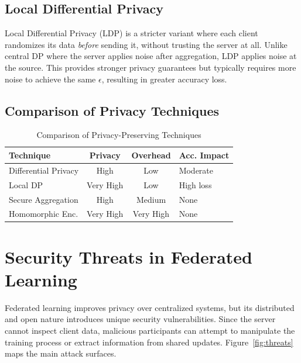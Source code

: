 \documentclass[conference]{IEEEtran}
\begin{document}
\subsection{Local Differential Privacy}

Local Differential Privacy (LDP) is a stricter variant where each client randomizes its data \emph{before} sending it, without trusting the server at all. Unlike central DP where the server applies noise after aggregation, LDP applies noise at the source. This provides stronger privacy guarantees but typically requires more noise to achieve the same $\epsilon$, resulting in greater accuracy loss.

\subsection{Comparison of Privacy Techniques}

\begin{table}[H]
\centering
\caption{Comparison of Privacy-Preserving Techniques}
\label{tab:privacy_compare}
\renewcommand{\arraystretch}{1.4}
\setlength{\tabcolsep}{4pt}
\begin{tabular}{|p{2.1cm}|c|c|p{1.5cm}|}
\hline
\textbf{Technique} & \textbf{Privacy} & \textbf{Overhead} & \textbf{Acc. Impact} \\
\hline
Differential Privacy   & High      & Low       & Moderate \\
Local DP               & Very High & Low       & High loss \\
Secure Aggregation     & High      & Medium    & None \\
Homomorphic Enc.       & Very High & Very High & None \\
\hline
\end{tabular}
\end{table}

\section{Security Threats in Federated Learning}

Federated learning improves privacy over centralized systems, but its distributed and open nature introduces unique security vulnerabilities. Since the server cannot inspect client data, malicious participants can attempt to manipulate the training process or extract information from shared updates. Figure~\ref{fig:threats} maps the main attack surfaces.
\end{document}
